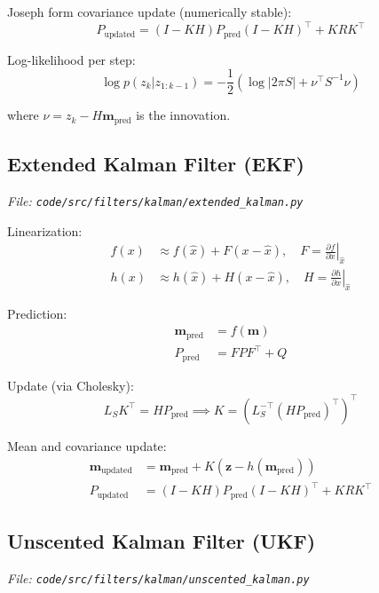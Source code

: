 \documentclass[12pt]{article}
\begin{document}
Joseph form covariance update (numerically stable):
\begin{equation}
P_{\text{updated}} = (I - KH) P_{\text{pred}} (I - KH)^\top + K R K^\top
\end{equation}

Log-likelihood per step:
\begin{equation}
\log p(z_k | z_{1:k-1}) = -\frac{1}{2} \left( \log|2\pi S| + \nu^\top S^{-1} \nu \right)
\end{equation}

where $\nu = z_k - H\boldsymbol{m}_{\text{pred}}$ is the innovation.

\subsection{Extended Kalman Filter (EKF)}
\textit{File: \texttt{code/src/filters/kalman/extended\_kalman.py}}

Linearization:
\begin{align}
f(x) &\approx f(\hat{x}) + F (x - \hat{x}), \quad F = \left.\frac{\partial f}{\partial x}\right|_{\hat{x}} \\
h(x) &\approx h(\hat{x}) + H (x - \hat{x}), \quad H = \left.\frac{\partial h}{\partial x}\right|_{\hat{x}}
\end{align}

Prediction:
\begin{align}
\boldsymbol{m}_{\text{pred}} &= f(\boldsymbol{m}) \\
P_{\text{pred}} &= F P F^\top + Q
\end{align}

Update (via Cholesky):
\begin{equation}
L_S K^\top = H P_{\text{pred}} \implies K = (L_S^{-\top} (H P_{\text{pred}})^\top)^\top
\end{equation}

Mean and covariance update:
\begin{align}
\boldsymbol{m}_{\text{updated}} &= \boldsymbol{m}_{\text{pred}} + K (\boldsymbol{z} - h(\boldsymbol{m}_{\text{pred}})) \\
P_{\text{updated}} &= (I - KH) P_{\text{pred}} (I - KH)^\top + K R K^\top
\end{align}

\subsection{Unscented Kalman Filter (UKF)}
\textit{File: \texttt{code/src/filters/kalman/unscented\_kalman.py}}
\end{document}
